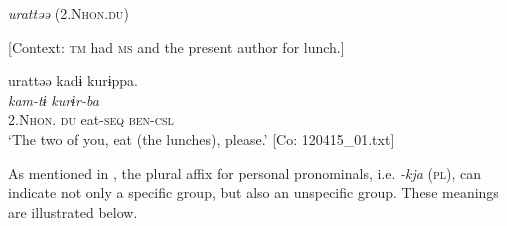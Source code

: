  \ex \label{ex:5:b} \textit{urattəə} (2.N\textsc{hon}.\textsc{du})

    [Context: \textsc{tm} had \textsc{ms} and the present author for lunch.]

\glll  urattəə  kadɨ  kurɨppa.\\
\textit{}  \textit{kam-tɨ}  \textit{kurɨr-ba}\\
2.N\textsc{hon}. \textsc{du}  eat-\textsc{seq}  \textsc{ben}-\textsc{csl}\\
\glt ‘The two of you, eat (the lunches), please.’ [Co: 120415\_01.txt]
\z
\z

  As mentioned in , the plural affix for personal pronominals, i.e. \textit{{}-kja} (\textsc{pl}), can indicate not only a specific group, but also an unspecific group. These meanings are illustrated below.

